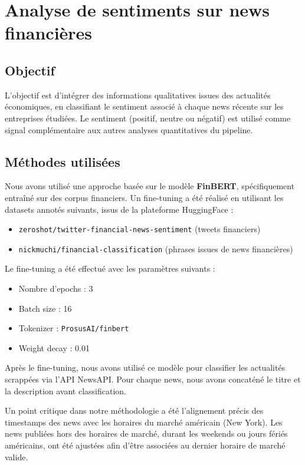 \documentclass[a4paper,12pt]{article}
\begin{document}
\section{Analyse de sentiments sur news financières}

\subsection*{Objectif}

L'objectif est d'intégrer des informations qualitatives issues des actualités économiques, en classifiant le sentiment associé à chaque news récente sur les entreprises étudiées. Le sentiment (positif, neutre ou négatif) est utilisé comme signal complémentaire aux autres analyses quantitatives du pipeline.

\subsection*{Méthodes utilisées}

Nous avons utilisé une approche basée sur le modèle \textbf{FinBERT}, spécifiquement entraîné sur des corpus financiers. Un fine-tuning a été réalisé en utilisant les datasets annotés suivants, issus de la plateforme HuggingFace :
\begin{itemize}
    \item \texttt{zeroshot/twitter-financial-news-sentiment} (tweets financiers)
    \item \texttt{nickmuchi/financial-classification} (phrases issues de news financières)
\end{itemize}

Le fine-tuning a été effectué avec les paramètres suivants :
\begin{itemize}
    \item Nombre d'epochs : 3
    \item Batch size : 16
    \item Tokenizer : \texttt{ProsusAI/finbert}
    \item Weight decay : 0.01
\end{itemize}

Après le fine-tuning, nous avons utilisé ce modèle pour classifier les actualités scrappées via l'API NewsAPI. Pour chaque news, nous avons concaténé le titre et la description avant classification.

Un point critique dans notre méthodologie a été l'alignement précis des timestamps des news avec les horaires du marché américain (New York). Les news publiées hors des horaires de marché, durant les weekends ou jours fériés américains, ont été ajustées afin d'être associées au dernier horaire de marché valide.
\end{document}
